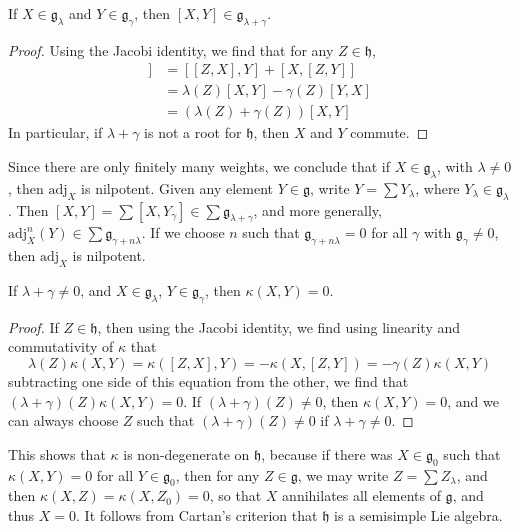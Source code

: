 \begin{theorem}
    If $X \in \mathfrak{g}_\lambda$ and $Y \in \mathfrak{g}_\gamma$, then $[X,Y] \in \mathfrak{g}_{\lambda + \gamma}$.
\end{theorem}
\begin{proof}
    Using the Jacobi identity, we find that for any $Z \in \mathfrak{h}$,
    \begin{align*}
        [Z,[X,Y]] &= [[Z,X],Y] + [X,[Z,Y]]\\
        &= \lambda(Z)[X,Y] - \gamma(Z)[Y,X]\\
        &= (\lambda(Z) + \gamma(Z))[X,Y]
    \end{align*}
    In particular, if $\lambda + \gamma$ is not a root for $\mathfrak{h}$, then $X$ and $Y$ commute.
\end{proof}

Since there are only finitely many weights, we conclude that if $X \in \mathfrak{g}_\lambda$, with $\lambda \neq 0$, then $\text{adj}_X$ is nilpotent. Given any element $Y \in \mathfrak{g}$, write $Y = \sum Y_\lambda$, where $Y_\lambda \in \mathfrak{g}_\lambda$. Then $[X,Y] = \sum [X,Y_\gamma] \in \sum \mathfrak{g}_{\lambda + \gamma}$, and more generally, $\text{adj}_X^n(Y) \in \sum \mathfrak{g}_{\gamma + n \lambda}$. If we choose $n$ such that $\mathfrak{g}_{\gamma + n \lambda} = 0$ for all $\gamma$ with $\mathfrak{g}_\gamma \neq 0$, then $\text{adj}_X$ is nilpotent.

\begin{theorem}
    If $\lambda + \gamma \neq 0$, and $X \in \mathfrak{g}_\lambda$, $Y \in \mathfrak{g}_\gamma$, then $\kappa(X,Y) = 0$.
\end{theorem}
\begin{proof}
    If $Z \in \mathfrak{h}$, then using the Jacobi identity, we find using linearity and commutativity of $\kappa$ that
    \[ \lambda(Z) \kappa(X,Y) = \kappa([Z,X],Y) = -\kappa(X,[Z,Y]) = - \gamma(Z) \kappa(X,Y) \]
    subtracting one side of this equation from the other, we find that $(\lambda + \gamma)(Z) \kappa(X,Y) = 0$. If $(\lambda + \gamma)(Z) \neq 0$, then $\kappa(X,Y) = 0$, and we can always choose $Z$ such that $(\lambda + \gamma)(Z) \neq 0$ if $\lambda + \gamma \neq 0$.
\end{proof}

This shows that $\kappa$ is non-degenerate on $\mathfrak{h}$, because if there was $X \in \mathfrak{g}_0$ such that $\kappa(X,Y) = 0$ for all $Y \in \mathfrak{g}_0$, then for any $Z \in \mathfrak{g}$, we may write $Z = \sum Z_\lambda$, and then $\kappa(X,Z) = \kappa(X,Z_0) = 0$, so that $X$ annihilates all elements of $\mathfrak{g}$, and thus $X = 0$. It follows from Cartan's criterion that $\mathfrak{h}$ is a semisimple Lie algebra.

